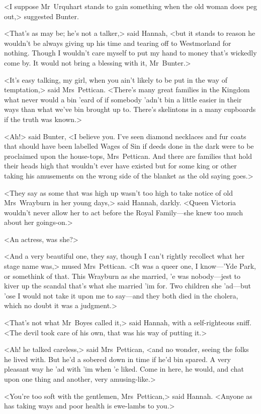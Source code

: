 <I suppose Mr~Urquhart stands to gain something when the old woman does peg out,> suggested Bunter.

<That's as may be; he's not a talker,> said Hannah, <but it stands to reason he wouldn't be always giving up his time and tearing off to Westmorland for nothing. Though I wouldn't care myself to put my hand to money that's wickedly come by. It would not bring a blessing with it, Mr~Bunter.>

<It's easy talking, my girl, when you ain't likely to be put in the way of temptation,> said Mrs~Pettican. <There's many great families in the Kingdom what never would a bin 'eard of if somebody 'adn't bin a little easier in their ways than what we've bin brought up to. There's skelintons in a many cupboards if the truth was known.>

<Ah!> said Bunter, <I believe you. I've seen diamond necklaces and fur coats that should have been labelled Wages of Sin if deeds done in the dark were to be proclaimed upon the house-tops, Mrs~Pettican. And there are families that hold their heads high that wouldn't ever have existed but for some king or other taking his amusements on the wrong side of the blanket as the old saying goes.>

<They say as some that was high up wasn't too high to take notice of old Mrs~Wrayburn in her young days,> said Hannah, darkly. <Queen Victoria wouldn't never allow her to act before the Royal Family—she knew too much about her goings-on.>

<An actress, was she?>

<And a very beautiful one, they say, though I can't rightly recollect what her stage name was,> mused Mrs~Pettican. <It was a queer one, I know—'Yde Park, or somethink of that. This Wrayburn as she married, 'e was nobody—jest to kiver up the scandal that's what she married 'im for. Two children she 'ad—but 'ose I would not take it upon me to say—and they both died in the cholera, which no doubt it was a judgment.>

<That's not what Mr~Boyes called it,> said Hannah, with a self-righteous sniff. <The devil took care of his own, that was his way of putting it.>

<Ah! he talked careless,> said Mrs~Pettican, <and no wonder, seeing the folks he lived with. But he'd a sobered down in time if he'd bin spared. A very pleasant way he 'ad with 'im when 'e liked. Come in here, he would, and chat upon one thing and another, very amusing-like.>

<You're too soft with the gentlemen, Mrs~Pettican,> said Hannah. <Anyone as has taking ways and poor health is ewe-lambs to you.>

